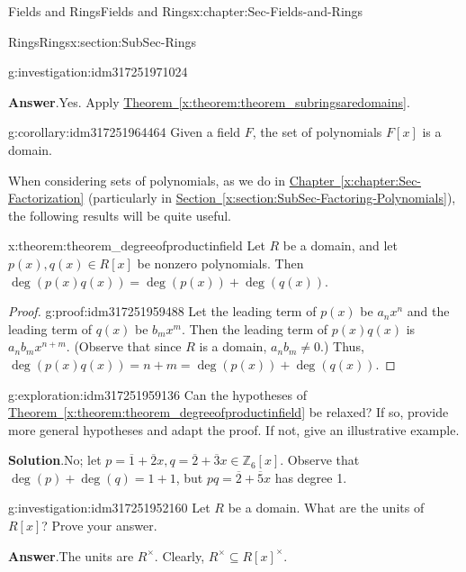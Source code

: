 \documentclass[oneside,10pt,]{book}
\newcommand{\blocktitlefont}{\relax}
\newcommand{\xreffont}{\relax}
\numberwithin{equation}{section}
\def\Z{{\mathbb Z}}
\begin{document}
\begin{chapterptx}{Fields and Rings}{}{Fields and Rings}{}{}{x:chapter:Sec-Fields-and-Rings}
\begin{sectionptx}{Rings}{}{Rings}{}{}{x:section:SubSec-Rings}
\begin{investigation}{}{g:investigation:idm317251971024}
\par\smallskip%
\noindent\textbf{\blocktitlefont Answer}.\hypertarget{g:answer:idm317251965616}{}\quad{}Yes. Apply \hyperref[x:theorem:theorem_subringsaredomains]{Theorem~{\xreffont\ref{x:theorem:theorem_subringsaredomains}}}.%
\end{investigation}
\begin{corollary}{}{}{g:corollary:idm317251964464}%
Given a field \(F\), the set of polynomials \(F[x]\) is a domain.%
\end{corollary}
When considering sets of polynomials, as we do in \hyperref[x:chapter:Sec-Factorization]{Chapter~{\xreffont\ref{x:chapter:Sec-Factorization}}} (particularly in \hyperref[x:section:SubSec-Factoring-Polynomials]{Section~{\xreffont\ref{x:section:SubSec-Factoring-Polynomials}}}), the following results will be quite useful.%
\begin{theorem}{}{}{x:theorem:theorem_degreeofproductinfield}%
Let \(R\) be a domain, and let \(p(x),q(x)\in R[x]\) be nonzero polynomials. Then \(\deg(p(x) q(x)) = \deg(p(x)) + \deg(q(x))\).%
\end{theorem}
\begin{proof}{}{g:proof:idm317251959488}
Let the leading term of \(p(x)\) be \(a_n x^n\) and the leading term of \(q(x)\) be \(b_m x^m\). Then the leading term of \(p(x) q(x)\) is \(a_n b_m x^{n+m}\). (Observe that since \(R\) is a domain, \(a_n b_m \ne 0\).) Thus, \(\deg(p(x) q(x)) = n+m = \deg(p(x)) + \deg(q(x))\).%
\end{proof}
\begin{exploration}{}{g:exploration:idm317251959136}%
Can the hypotheses of \hyperref[x:theorem:theorem_degreeofproductinfield]{Theorem~{\xreffont\ref{x:theorem:theorem_degreeofproductinfield}}} be relaxed? If so, provide more general hypotheses and adapt the proof. If not, give an illustrative example.%
\par\smallskip%
\noindent\textbf{\blocktitlefont Solution}.\hypertarget{g:solution:idm317251953936}{}\quad{}No; let \(p = \overline{1} + \overline{2}x, q = \overline{2} + \overline{3}x\in \Z_6[x]\). Observe that \(\deg(p) + \deg(q) = 1 + 1\), but \(pq = \overline{2} + \overline{5}x\) has degree 1.%
\end{exploration}
\begin{investigation}{}{g:investigation:idm317251952160}%
Let \(R\) be a domain. What are the units of \(R[x]\)? Prove your answer.%
\par\smallskip%
\noindent\textbf{\blocktitlefont Answer}.\hypertarget{g:answer:idm317251950704}{}\quad{}The units are \(R^\times\). Clearly, \(R^\times\subseteq R[x]^\times\).%

\end{investigation}
\end{sectionptx}
\end{chapterptx}
\end{document}
